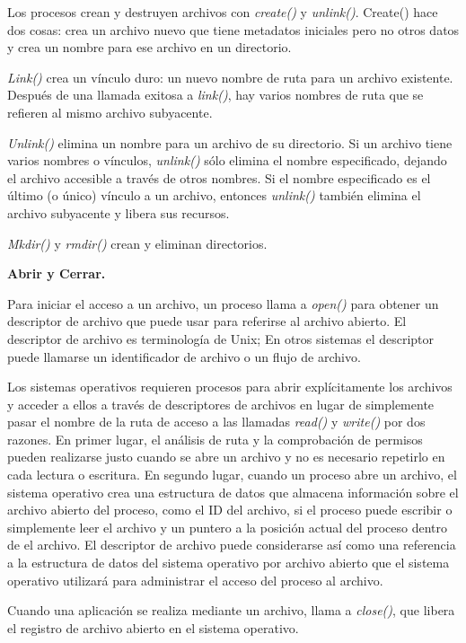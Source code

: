 \documentclass[10pt]{book}
\begin{document}
Los procesos crean y destruyen archivos con \textit{create()} y \textit{unlink()}. Create() hace dos cosas: crea un archivo nuevo que tiene metadatos iniciales pero no otros datos y crea un nombre para ese archivo en un directorio.

\textit{Link()} crea un vínculo duro: un nuevo nombre de ruta para un archivo existente. Después de una llamada exitosa a \textit{link()}, hay varios nombres de ruta que se refieren al mismo archivo subyacente.

\textit{Unlink()} elimina un nombre para un archivo de su directorio. Si un archivo tiene varios nombres o vínculos, \textit{unlink()} sólo elimina el nombre especificado, dejando el archivo accesible a través de otros nombres. Si el nombre especificado es el último (o único) vínculo a un archivo, entonces \textit{unlink()} también elimina el archivo subyacente y libera sus recursos.

\textit{Mkdir()} y \textit{rmdir()} crean y eliminan directorios.

\textbf{Abrir y Cerrar.}

Para iniciar el acceso a un archivo, un proceso llama a \textit{open()} para obtener un descriptor de archivo que puede usar para referirse al archivo abierto. El descriptor de archivo es terminología de Unix; En otros sistemas el descriptor puede llamarse un identificador de archivo o un flujo de archivo.

Los sistemas operativos requieren procesos para abrir explícitamente los archivos y acceder a ellos a través de descriptores de archivos en lugar de simplemente pasar el nombre de la ruta de acceso a las llamadas \textit{read()} y \textit{write()} por dos razones. En primer lugar, el análisis de ruta y la comprobación de permisos pueden realizarse justo cuando se abre un archivo y no es necesario repetirlo en cada lectura o escritura. En segundo lugar, cuando un proceso abre un archivo, el sistema operativo crea una estructura de datos que almacena información sobre el archivo abierto del proceso, como el ID del archivo, si el proceso puede escribir o simplemente leer el archivo y un puntero a la posición actual del proceso dentro de el archivo. El descriptor de archivo puede considerarse así como una referencia a la estructura de datos del sistema operativo por archivo abierto que el sistema operativo utilizará para administrar el acceso del proceso al archivo.

Cuando una aplicación se realiza mediante un archivo, llama a \textit{close()}, que libera el registro de archivo abierto en el sistema operativo.
\end{document}

